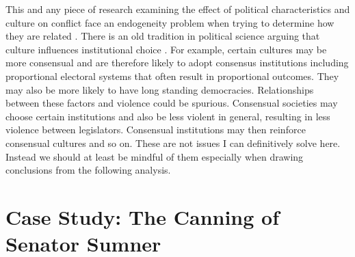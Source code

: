 \documentclass[a4paper]{article}\usepackage[]{graphicx}\usepackage[]{color}
\begin{document}
This and any piece of research examining the effect of political characteristics and culture on conflict face an endogeneity problem when trying to determine how they are related \citep[][751]{Carey2000}. There is an old tradition in political science \citep[][528--529]{Frye1997} arguing that culture influences institutional choice \citep[in particular see][]{Almond1963}. For example, certain cultures may be more consensual and are therefore likely to adopt consensus institutions \citep[][22-23]{Lijphart2003} including proportional electoral systems that often result in proportional outcomes. They may also be more likely to have long standing democracies. Relationships between these factors and violence could be spurious. Consensual societies may choose certain institutions and also be less violent in general, resulting in less violence between legislators. Consensual institutions may then reinforce consensual cultures and so on. These are not issues I can definitively solve here. Instead we should at least be mindful of them especially when drawing conclusions from the following analysis.

\section{Case Study: The Canning of Senator Sumner}
\end{document}

